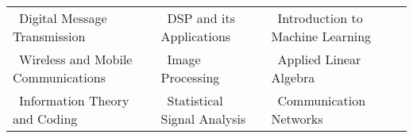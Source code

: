 \documentclass[10pt]{article}
\begin{document}
	
	\begin{tabular}{ l l l }
		\hspace{0.55cm}\textbullet\ Digital Message Transmission &  \textbullet\ DSP and its Applications & \textbullet\ Introduction to Machine Learning\vspace{0.04cm}\\
		\hspace{0.55cm}\textbullet\ Wireless and Mobile Communications & \textbullet\ Image Processing & \textbullet\ Applied Linear Algebra\vspace{0.04cm}\\
		\hspace{0.55cm}\textbullet\ Information Theory and Coding & \textbullet\ Statistical Signal Analysis  & \textbullet\ Communication Networks\\ 
		
	\end{tabular}
	\setlength{\tabcolsep}{0.2cm}
	
	
	\vspace{0.15cm}
	

\colorbox{bl}{}
\end{document}
